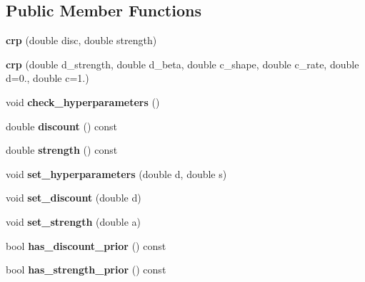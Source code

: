 \subsection*{Public Member Functions}
\begin{DoxyCompactItemize}
\item 
\mbox{\label{classcpyp_1_1crp_a070dd45780a6beee2cbdd5cc46f94956}} 
{\bfseries crp} (double disc, double strength)
\item 
\mbox{\label{classcpyp_1_1crp_ad670fddfce49296dfdebf903fc212f16}} 
{\bfseries crp} (double d\+\_\+strength, double d\+\_\+beta, double c\+\_\+shape, double c\+\_\+rate, double d=0., double c=1.)
\item 
\mbox{\label{classcpyp_1_1crp_ab59c6b01fc2af2bbf0182cbbaef81064}} 
void {\bfseries check\+\_\+hyperparameters} ()
\item 
\mbox{\label{classcpyp_1_1crp_ac72427d1192a326c80af5fc36e936b90}} 
double {\bfseries discount} () const
\item 
\mbox{\label{classcpyp_1_1crp_aea5f806b3768dcd57eec4ec05f6cbd77}} 
double {\bfseries strength} () const
\item 
\mbox{\label{classcpyp_1_1crp_a83bc4faf38bc25b3697dc1c4d9a4435d}} 
void {\bfseries set\+\_\+hyperparameters} (double d, double s)
\item 
\mbox{\label{classcpyp_1_1crp_a8b180125212e2d5c1d66260c4dfcde86}} 
void {\bfseries set\+\_\+discount} (double d)
\item 
\mbox{\label{classcpyp_1_1crp_ae9495bdcf6b0dac278528282cb0d7999}} 
void {\bfseries set\+\_\+strength} (double a)
\item 
\mbox{\label{classcpyp_1_1crp_acc1628a35c1c9207fb75ea32778eb082}} 
bool {\bfseries has\+\_\+discount\+\_\+prior} () const
\item 
\mbox{\label{classcpyp_1_1crp_aa55db034fc35e332cf4c19ee1defd337}} 
bool {\bfseries has\+\_\+strength\+\_\+prior} () const

\end{DoxyCompactItemize}
